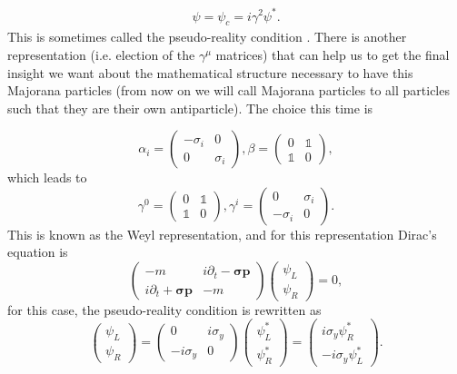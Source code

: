 \begin{eqnarray}
  \psi = \psi_c = i\gamma^2\psi^*.
\end{eqnarray}
This is sometimes called the pseudo-reality condition \cite{Jackiw2012}. There is another representation (i.e. election of the $\gamma^\mu$ matrices) that can help us to get the final insight we want about the mathematical structure necessary to have this Majorana particles (from now on we will call Majorana particles to all particles such that they are their own antiparticle). The choice this time is

\begin{equation}
    \alpha_i = \begin{pmatrix}
    -\sigma_i & 0\\
    0 & \sigma_i
    \end{pmatrix}, \beta = \begin{pmatrix}
     0 & \mathbb{1}\\
    \mathbb{1} & 0
    \end{pmatrix},
\end{equation}
which leads to
\begin{equation}
    \gamma^0 = \begin{pmatrix}
    0 & \mathbb{1}\\
    \mathbb{1} & 0
    \end{pmatrix}, \gamma^i = \begin{pmatrix}
    0 & \sigma_i\\
    -\sigma_i & 0
    \end{pmatrix}.
\end{equation}
This is known as the Weyl representation, and for this representation Dirac's equation is 
\begin{equation}
    \begin{pmatrix}
     -m & i\partial_t -\bm{\sigma p} \\ i\partial_t +\bm{\sigma p} & -m
    \end{pmatrix}\begin{pmatrix} \psi_L\\ \psi_R \end{pmatrix} = 0,
\end{equation}
for this case, the pseudo-reality condition is rewritten as 
\begin{equation}
    \begin{pmatrix} \psi_L\\ \psi_R \end{pmatrix} = \begin{pmatrix}
    0 & i\sigma_y\\
    -i\sigma_y & 0
    \end{pmatrix}\begin{pmatrix} \psi_L^*\\ \psi_R^* \end{pmatrix} = 
    \begin{pmatrix} i\sigma_y\psi_R^*\\ -i\sigma_y\psi_L^* \end{pmatrix}. 
\end{equation}

